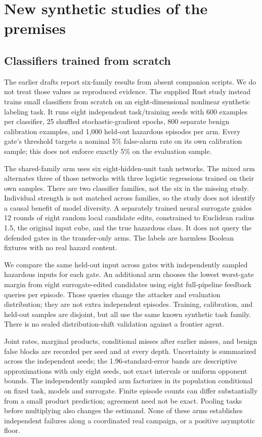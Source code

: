\section{New synthetic studies of the premises}
\label{sec:monitors}

\subsection{Classifiers trained from scratch}
The earlier drafts report six-family results from absent companion scripts. We do not treat those values as reproduced evidence. The supplied Rust study instead trains small classifiers from scratch on an eight-dimensional nonlinear synthetic labeling task. It runs eight independent task/training seeds with 600 examples per classifier, 25 shuffled stochastic-gradient epochs, 800 separate benign calibration examples, and 1,000 held-out hazardous episodes per arm. Every gate's threshold targets a nominal 5\% false-alarm rate on its own calibration sample; this does not enforce exactly 5\% on the evaluation sample.

The shared-family arm uses six eight-hidden-unit tanh networks. The mixed arm alternates three of those networks with three logistic regressions trained on their own samples. There are two classifier families, not the six in the missing study. Individual strength is not matched across families, so the study does not identify a causal benefit of model diversity. A separately trained neural surrogate guides 12 rounds of eight random local candidate edits, constrained to Euclidean radius 1.5, the original input cube, and the true hazardous class. It does not query the defended gates in the transfer-only arms. The labels are harmless Boolean fixtures with no real hazard content.

We compare the same held-out input across gates with independently sampled hazardous inputs for each gate. An additional arm chooses the lowest worst-gate margin from eight surrogate-edited candidates using eight full-pipeline feedback queries per episode. Those queries change the attacker and evaluation distribution; they are not extra independent episodes. Training, calibration, and held-out samples are disjoint, but all use the same known synthetic task family. There is no sealed distribution-shift validation against a frontier agent.




Joint rates, marginal products, conditional misses after earlier misses, and benign false blocks are recorded per seed and at every depth. Uncertainty is summarized across the independent seeds; the 1.96-standard-error bands are descriptive approximations with only eight seeds, not exact intervals or uniform opponent bounds. The independently sampled arm factorizes in its population conditional on fixed task, models and surrogate. Finite episode counts can differ substantially from a small product prediction; agreement need not be exact. Pooling tasks before multiplying also changes the estimand. None of these arms establishes independent failures along a coordinated real campaign, or a positive asymptotic floor.

